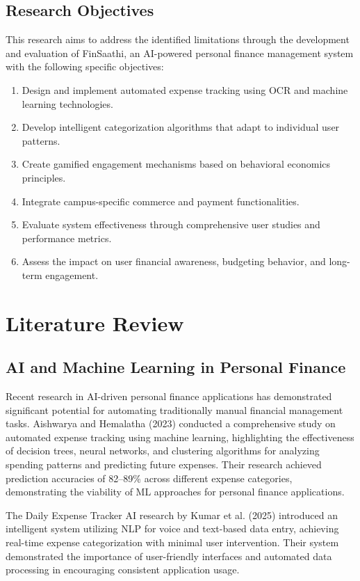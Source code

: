 \documentclass[10pt,twocolumn,twoside,a4paper]{article}
\begin{document}
\subsection{Research Objectives}
This research aims to address the identified limitations through the development and evaluation of FinSaathi, an AI-powered personal finance management system with the following specific objectives:
\begin{enumerate}
  \item Design and implement automated expense tracking using OCR and machine learning technologies.
  \item Develop intelligent categorization algorithms that adapt to individual user patterns.
  \item Create gamified engagement mechanisms based on behavioral economics principles.
  \item Integrate campus-specific commerce and payment functionalities.
  \item Evaluate system effectiveness through comprehensive user studies and performance metrics.
  \item Assess the impact on user financial awareness, budgeting behavior, and long-term engagement.
\end{enumerate}

\section{Literature Review}
\subsection{AI and Machine Learning in Personal Finance}
Recent research in AI-driven personal finance applications has demonstrated significant potential for automating traditionally manual financial management tasks. Aishwarya and Hemalatha (2023) conducted a comprehensive study on automated expense tracking using machine learning, highlighting the effectiveness of decision trees, neural networks, and clustering algorithms for analyzing spending patterns and predicting future expenses. Their research achieved prediction accuracies of 82--89\% across different expense categories, demonstrating the viability of ML approaches for personal finance applications.

The Daily Expense Tracker AI research by Kumar et al. (2025) introduced an intelligent system utilizing NLP for voice and text-based data entry, achieving real-time expense categorization with minimal user intervention. Their system demonstrated the importance of user-friendly interfaces and automated data processing in encouraging consistent application usage.
\end{document}
